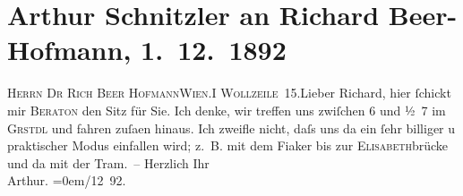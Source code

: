

         
         \renewcommand{\erwaehntePersonen}{Personen: Richard Beer-Hofmann, Ferry Bératon}
         \renewcommand{\erwaehnteOrte}{Orte: Café Griensteidl, Elisabethbrücke, Wien, Wollzeile}
         \renewcommand{\erwaehnteWerke}{}
               \section[Arthur Schnitzler an Richard Beer-Hofmann, 1. 12. 1892]{ Arthur Schnitzler an Richard Beer-Hofmann, 1. 12. 1892}\nopagebreak{}\rehead{ }\begin{ledgroupsized}[t]{13cm}\normalsize\beginnumbering \toendnotes[C]{\smallbreak\pagebreak[2]} 
\pstart{}{\pb}\textsc{Herrn Dr Rich Beer Hofmann}\pend{}\pstart{}\textsc{Wien.}\pend{}\pstart{}\textsc{I Wollzeile 15}.\pend{}{\bigskip}\pstart{}{\pb}Lieber Richard, \pend\pstart
           hier ſchickt mir \textsc{Beraton} den Sitz für Sie. Ich
               denke, wir treffen uns zwiſchen 6 und ½ 7 im \textsc{Grstdl} und fahren zuſa{\geminationm}en hinaus. Ich zweifle
               nicht, daſs uns da ein ſehr billiger \introOben{}u praktischer\introOben{} Modus
               einfallen wird; z. B. mit dem Fiaker bis zur \textsc{Elisabeth}brücke und da{\geminationn}{ }{\pb}mit der Tram. –\pend
           \pstart
           Herzlich Ihr{\\[\baselineskip]}\spacefill\mbox{Arthur.}\pend
           \leftskip=0em{}/12 92.
               \pend
           
         
         \endnumbering{}\end{ledgroupsized}  \newcommand{\dateiname}{L00140}\newcommand{\titel}{Arthur Schnitzler an Richard Beer-Hofmann, 1. 12. 1892}\newcommand{\editorInnen}{Martin Anton Müller und Gerd-Hermann Susen}
      